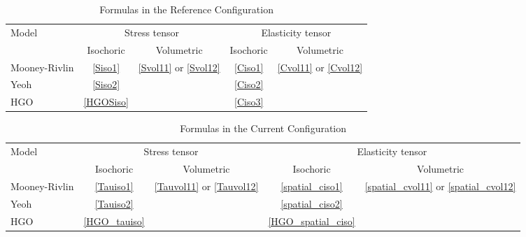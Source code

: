 \begin{appendices}
\begin{table}[H]
\centering
\caption{Formulas in the Reference Configuration}
\label{summary1}
\begin{tabular}{l c c c c} 
\toprule
\multirow{2}{*}{Model}  &  \multicolumn{2}{c}{Stress tensor} &  \multicolumn{2}{c}{Elasticity tensor} \\
\cmidrule(l){2-5}
& Isochoric  & Volumetric &  Isochoric  & Volumetric  \\
\midrule
Mooney-Rivlin  & \ref{Siso1} & \multirow{3}{*}{\ref{Svol11} or \ref{Svol12}} & \ref{Ciso1} & \multirow{3}{*}{\ref{Cvol11} or \ref{Cvol12}} \\
Yeoh & \ref{Siso2} & & \ref{Ciso2} &\\
HGO & \ref{HGOSiso} & & \ref{Ciso3} &\\ 
\bottomrule
\end{tabular}
\end{table}

\begin{table}[H]
\centering
\caption{Formulas in the Current Configuration}
\label{summary2}
\begin{tabular}{l c c c c} 
\toprule
\multirow{2}{*}{Model}  &  \multicolumn{2}{c}{Stress tensor} &  \multicolumn{2}{c}{Elasticity tensor} \\
\cmidrule(l){2-5}
& Isochoric  & Volumetric &  Isochoric  & Volumetric  \\
\midrule
Mooney-Rivlin  & \ref{Tauiso1} & \multirow{3}{*}{\ref{Tauvol11} or \ref{Tauvol12}} & \ref{spatial_ciso1} & \multirow{3}{*}{\ref{spatial_cvol11} or \ref{spatial_cvol12}} \\
Yeoh & \ref{Tauiso2} & & \ref{spatial_ciso2} &\\
HGO & \ref{HGO_tauiso} & & \ref{HGO_spatial_ciso} &\\ 
\bottomrule
\end{tabular}
\end{table}

\end{appendices}
